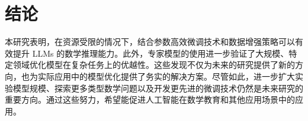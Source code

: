 \section{结论}
\label{sec:conclusion}
本研究表明，在资源受限的情况下，结合参数高效微调技术和数据增强策略可以有效提升 LLMs 的数学推理能力。此外，专家模型的使用进一步验证了大规模、特定领域优化模型在复杂任务上的优越性。这些发现不仅为未来的研究提供了新的方向，也为实际应用中的模型优化提供了务实的解决方案。尽管如此，进一步扩大实验模型规模、探索更多类型数学问题以及开发更先进的微调技术仍然是未来研究的重要方向。通过这些努力，希望能促进人工智能在数学教育和其他应用场景中的应用。
